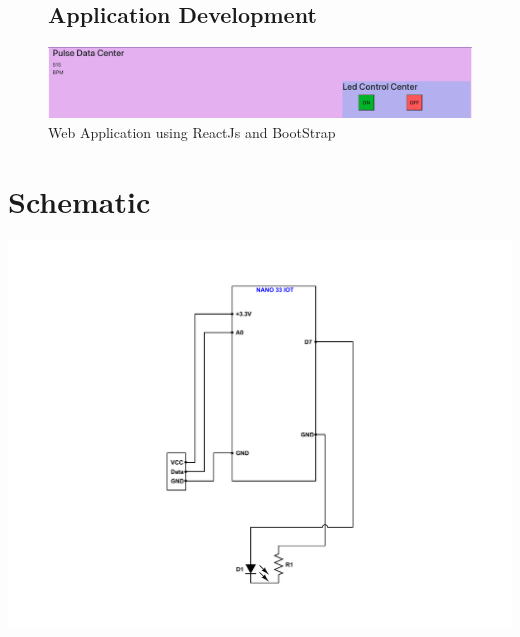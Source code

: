 \documentclass{report}
\begin{document}
\begin{figure}
\subsection{Application Development}
    \centering
    \includegraphics[scale=0.3]{images/AppDisplay.png}
    \caption{Web Application using ReactJs and BootStrap}
    \label{fig:image9}
\end{figure}


\section{Schematic}
\includegraphics[scale=0.5]{documents/schematicsNano.pdf}
\centering
\caption{Figure 10: Circuit of Led and Pulse sensor}
\label{fig:image10}

\raggedright
\end{document}
